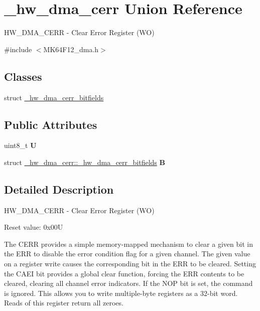 \hypertarget{union__hw__dma__cerr}{}\section{\+\_\+hw\+\_\+dma\+\_\+cerr Union Reference}
\label{union__hw__dma__cerr}


H\+W\+\_\+\+D\+M\+A\+\_\+\+C\+E\+RR -\/ Clear Error Register (WO)  




{\ttfamily \#include $<$M\+K64\+F12\+\_\+dma.\+h$>$}

\subsection*{Classes}
\begin{DoxyCompactItemize}
\item 
struct \hyperlink{struct__hw__dma__cerr_1_1__hw__dma__cerr__bitfields}{\+\_\+hw\+\_\+dma\+\_\+cerr\+\_\+bitfields}
\end{DoxyCompactItemize}
\subsection*{Public Attributes}
\begin{DoxyCompactItemize}
\item 
uint8\+\_\+t {\bfseries U}\hypertarget{union__hw__dma__cerr_a794117848ba768dcc81c1329c1c0d4b5}{}\label{union__hw__dma__cerr_a794117848ba768dcc81c1329c1c0d4b5}

\item 
struct \hyperlink{struct__hw__dma__cerr_1_1__hw__dma__cerr__bitfields}{\+\_\+hw\+\_\+dma\+\_\+cerr\+::\+\_\+hw\+\_\+dma\+\_\+cerr\+\_\+bitfields} {\bfseries B}\hypertarget{union__hw__dma__cerr_a14be045bd19de9a0f01b0236907a0e2d}{}\label{union__hw__dma__cerr_a14be045bd19de9a0f01b0236907a0e2d}

\end{DoxyCompactItemize}


\subsection{Detailed Description}
H\+W\+\_\+\+D\+M\+A\+\_\+\+C\+E\+RR -\/ Clear Error Register (WO) 

Reset value\+: 0x00U

The C\+E\+RR provides a simple memory-\/mapped mechanism to clear a given bit in the E\+RR to disable the error condition flag for a given channel. The given value on a register write causes the corresponding bit in the E\+RR to be cleared. Setting the C\+A\+EI bit provides a global clear function, forcing the E\+RR contents to be cleared, clearing all channel error indicators. If the N\+OP bit is set, the command is ignored. This allows you to write multiple-\/byte registers as a 32-\/bit word. Reads of this register return all zeroes. 

